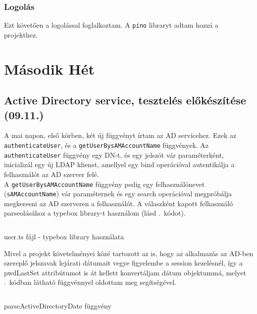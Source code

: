 \documentclass[a4paper]{article}
\newcommand{\inlts}[1]{\texttt{#1}}
\newcommand{\inltxt}[1]{\texttt{#1}}
\begin{document}
\subsubsection*{Logolás}

Ezt követően a logolással foglalkoztam. A \inltxt{pino} libraryt adtam hozzá a projekthez.

\section{Második Hét}

\subsection{Active Directory service, tesztelés előkészítése (09.11.)}

A mai napon, első körben, két új függvényt írtam az AD servicehez. Ezek az \inlts{authenticateUser}, és
a \inlts{getUserBysAMAccountName} függvények. Az \inlts{authenticateUser} függvény egy DN-t, és egy
jelszót vár paraméterként, inicializál egy új LDAP klienst, amellyel egy bind operációval autentikálja a
felhasználót az AD szerver felé. \\

A \inlts{getUserBysAMAccountName} függvény pedig egy felhasználónevet (\inlts{sAMAccountName}) vár
paraméternek és egy search operációval megpróbálja megkeresni az AD szerveren a felhasználót. A
válaszként kapott felhasználó parseolásához a typebox library-t használom (lásd .~kódot).

\begin{listing}[!ht]
\inputminted[bgcolor=codebg, breaklines, breakanywhere, fontsize=\small]{typescript}{code/user.ts}
\caption{user.ts fájl - typebox library használata}
\label{listing:user_typebox}
\end{listing}

Mivel a projekt követelményei közé tartozott az is, hogy az alkalmazás az AD-ben szereplő jelszavak
lejárati dátumait vegye figyelembe a session kezelésnél, így a pwdLastSet attribútumot is át kellett
konvertáljam dátum objektummá, melyet .~kódban látható függvénnyel
oldottam meg  segítségével.

\begin{listing}[!ht]
\inputminted[bgcolor=codebg, breaklines, breakanywhere, fontsize=\small]{typescript}{code/activeDirectoryUtils.ts}
\caption{parseActiveDirectoryDate függvény}
\label{listing:active_directory_utils}
\end{listing}
\end{document}

